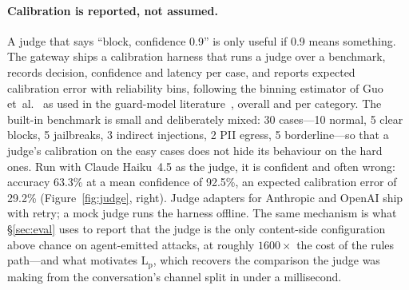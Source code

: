 \paragraph{Calibration is reported, not assumed.}
A judge that says ``block, confidence 0.9'' is only useful if 0.9 means
something. The gateway ships a calibration harness that runs a judge
over a benchmark, records decision, confidence and latency per case, and
reports expected calibration error with reliability bins, following the
binning estimator of Guo et~al.~\cite{guo2017calibration} as used in the
guard-model literature~\cite{liu2025calibration}, overall and per
category. The built-in benchmark is small and deliberately mixed: 30
cases---10 normal, 5 clear blocks, 5 jailbreaks, 3 indirect injections, 2
PII egress, 5 borderline---so that a judge's calibration on the easy
cases does not hide its behaviour on the hard ones. Run with Claude Haiku~4.5 as the judge, it is confident and often wrong: accuracy 63.3\% at a mean confidence of 92.5\%, an expected calibration error of 29.2\% (Figure~\ref{fig:judge}, right). Judge adapters for
Anthropic and OpenAI ship with retry; a mock judge runs the harness
offline. The same mechanism is what \S\ref{sec:eval} uses to report that
the judge is the only content-side configuration above chance on
agent-emitted attacks, at roughly $1600\times$ the cost of the rules
path---and what motivates L$_\mathrm{p}$, which recovers the comparison
the judge was making from the conversation's channel split in under a
millisecond.
